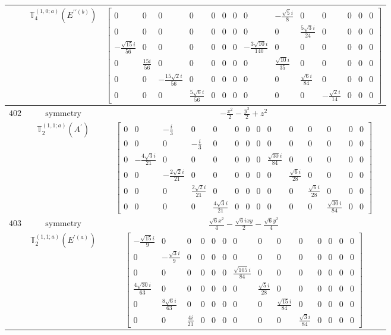 \documentclass[fleqn,8pt,landscape]{jsarticle}
\begin{document}
\begin{longtable}{ccc}
$  $ & $ \mathbb{T}_{4}^{(1,0;a)}(E^{\prime\prime(b)}) $ & $ \begin{bmatrix} 0 & 0 & 0 & 0 & 0 & 0 & 0 & 0 & - \frac{\sqrt{5} i}{8} & 0 & 0 & 0 & 0 & 0 \\ 0 & 0 & 0 & 0 & 0 & 0 & 0 & 0 & 0 & \frac{5 \sqrt{3} i}{24} & 0 & 0 & 0 & 0 \\ - \frac{\sqrt{15} i}{56} & 0 & 0 & 0 & 0 & 0 & 0 & - \frac{3 \sqrt{10} i}{140} & 0 & 0 & 0 & 0 & 0 & 0 \\ 0 & \frac{15 i}{56} & 0 & 0 & 0 & 0 & 0 & 0 & \frac{\sqrt{10} i}{35} & 0 & 0 & 0 & 0 & 0 \\ 0 & 0 & - \frac{15 \sqrt{2} i}{56} & 0 & 0 & 0 & 0 & 0 & 0 & \frac{\sqrt{6} i}{84} & 0 & 0 & 0 & 0 \\ 0 & 0 & 0 & \frac{5 \sqrt{6} i}{56} & 0 & 0 & 0 & 0 & 0 & 0 & - \frac{\sqrt{2} i}{14} & 0 & 0 & 0 \end{bmatrix} $ \\ \hline
$ 402 $ & $ \text{symmetry} $ & $ - \frac{x^{2}}{2} - \frac{y^{2}}{2} + z^{2} $ \\
$  $ & $ \mathbb{T}_{2}^{(1,1;a)}(A^{\prime}) $ & $ \begin{bmatrix} 0 & 0 & - \frac{i}{3} & 0 & 0 & 0 & 0 & 0 & 0 & 0 & 0 & 0 & 0 & 0 \\ 0 & 0 & 0 & - \frac{i}{3} & 0 & 0 & 0 & 0 & 0 & 0 & 0 & 0 & 0 & 0 \\ 0 & - \frac{4 \sqrt{3} i}{21} & 0 & 0 & 0 & 0 & 0 & 0 & \frac{\sqrt{30} i}{84} & 0 & 0 & 0 & 0 & 0 \\ 0 & 0 & - \frac{2 \sqrt{2} i}{21} & 0 & 0 & 0 & 0 & 0 & 0 & \frac{\sqrt{6} i}{28} & 0 & 0 & 0 & 0 \\ 0 & 0 & 0 & \frac{2 \sqrt{2} i}{21} & 0 & 0 & 0 & 0 & 0 & 0 & \frac{\sqrt{6} i}{28} & 0 & 0 & 0 \\ 0 & 0 & 0 & 0 & \frac{4 \sqrt{3} i}{21} & 0 & 0 & 0 & 0 & 0 & 0 & \frac{\sqrt{30} i}{84} & 0 & 0 \end{bmatrix} $ \\ \hline
$ 403 $ & $ \text{symmetry} $ & $ \frac{\sqrt{6} x^{2}}{4} - \frac{\sqrt{6} i x y}{2} - \frac{\sqrt{6} y^{2}}{4} $ \\
$  $ & $ \mathbb{T}_{2}^{(1,1;a)}(E^{\prime(a)}) $ & $ \begin{bmatrix} - \frac{\sqrt{15} i}{9} & 0 & 0 & 0 & 0 & 0 & 0 & 0 & 0 & 0 & 0 & 0 & 0 & 0 \\ 0 & - \frac{\sqrt{3} i}{9} & 0 & 0 & 0 & 0 & 0 & 0 & 0 & 0 & 0 & 0 & 0 & 0 \\ 0 & 0 & 0 & 0 & 0 & 0 & \frac{\sqrt{105} i}{84} & 0 & 0 & 0 & 0 & 0 & 0 & 0 \\ \frac{4 \sqrt{30} i}{63} & 0 & 0 & 0 & 0 & 0 & 0 & \frac{\sqrt{5} i}{28} & 0 & 0 & 0 & 0 & 0 & 0 \\ 0 & \frac{8 \sqrt{6} i}{63} & 0 & 0 & 0 & 0 & 0 & 0 & \frac{\sqrt{15} i}{84} & 0 & 0 & 0 & 0 & 0 \\ 0 & 0 & \frac{4 i}{21} & 0 & 0 & 0 & 0 & 0 & 0 & \frac{\sqrt{3} i}{84} & 0 & 0 & 0 & 0 \end{bmatrix} $ \\ \hline

\end{longtable}
\end{document}
